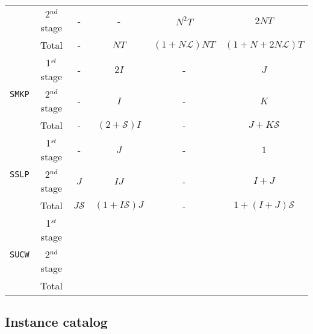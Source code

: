 \begin{table}[H]
{\begin{tabular}{@{}cccccc@{}}
			& 2$^{nd}$ stage & -              & -                                  & $N^2 T$              & $2NT$                     \\ \cmidrule(l){2-6} 
			& Total          & -              & $NT$                               & $(1+N\mathcal{L})NT$ & $(1+N+2N\mathcal{L})T$    \\ \midrule
			\multirow{3}{*}{\texttt{SMKP}}   & 1$^{st}$ stage & -              & $2I$                               & -                    & $J$                       \\
			& 2$^{nd}$ stage & -              & $I$                                & -                    & $K$                       \\ \cmidrule(l){2-6} 
			& Total          & -              & $(2+\mathcal{S})I$                 & -                    & $J+K\mathcal{S}$          \\ \midrule
			\multirow{3}{*}{\texttt{SSLP}}   & 1$^{st}$ stage & -              & $J$                                & -                    & $1$                       \\
			& 2$^{nd}$ stage & $J$            & $IJ$                               & -                    & $I+J$                     \\ \cmidrule(l){2-6} 
			& Total          & $J\mathcal{S}$ & $(1+I\mathcal{S})J$                & -                    & $1+(I+J)\mathcal{S}$      \\ \midrule
			\multirow{3}{*}{\texttt{SUCW}}   & 1$^{st}$ stage &                &                                    &                      &                           \\
			& 2$^{nd}$ stage &                &                                    &                      &                           \\ \cmidrule(l){2-6} 
			& Total          &                &                                    &                      &                           \\ \bottomrule
		\end{tabular}%
	}
\end{table}

\subsection{Instance catalog}


